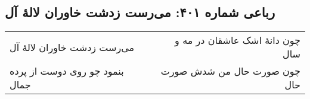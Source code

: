 \begin{center}
\section*{رباعی شماره ۴۰۱: می‌رست زدشت خاوران لالهٔ آل}
\label{sec:sh401}
\begin{longtable}{l p{0.5cm} r}
می‌رست زدشت خاوران لالهٔ آل
&&
چون دانهٔ اشک عاشقان در مه و سال
\\
بنمود چو روی دوست از پرده جمال
&&
چون صورت حال من شدش صورت حال
\\
\end{longtable}
\end{center}
